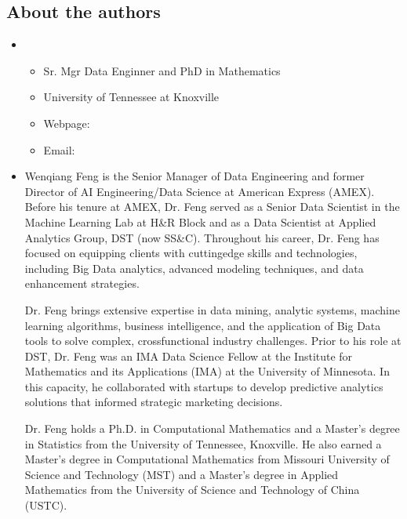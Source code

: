 \documentclass[letterpaper,11pt,english]{sphinxmanual}
\begin{document}
\subsection{About the authors}
\label{\detokenize{preface:about-the-authors}}\begin{itemize}
\item {} 
\sphinxAtStartPar
{}
\begin{itemize}
\item {} 
\sphinxAtStartPar
Sr. Mgr Data Enginner and PhD in Mathematics

\item {} 
\sphinxAtStartPar
University of Tennessee at Knoxville

\item {} 
\sphinxAtStartPar
Webpage: 

\item {} 
\sphinxAtStartPar
Email: 

\end{itemize}

\item {} 
\sphinxAtStartPar
{}

\sphinxAtStartPar
Wenqiang Feng is the Senior Manager of Data Engineering and former Director of
AI Engineering/Data Science at American Express (AMEX). Before his tenure at
AMEX, Dr. Feng served as a Senior Data Scientist in the Machine Learning Lab
at H\&R Block and as a Data Scientist at Applied Analytics Group, DST (now SS\&C).
Throughout his career, Dr. Feng has focused on equipping clients with cutting\sphinxhyphen{}edge
skills and technologies, including Big Data analytics, advanced modeling
techniques, and data enhancement strategies.

\sphinxAtStartPar
Dr. Feng brings extensive expertise in data mining, analytic systems, machine
learning algorithms, business intelligence, and the application of Big Data
tools to solve complex, cross\sphinxhyphen{}functional industry challenges. Prior to his
role at DST, Dr. Feng was an IMA Data Science Fellow at the Institute for
Mathematics and its Applications (IMA) at the University of Minnesota.
In this capacity, he collaborated with startups to develop predictive
analytics solutions that informed strategic marketing decisions.

\sphinxAtStartPar
Dr. Feng holds a Ph.D. in Computational Mathematics and a Master’s degree
in Statistics from the University of Tennessee, Knoxville. He also earned a
Master’s degree in Computational Mathematics from Missouri University
of Science and Technology (MST) and a Master’s degree in Applied
Mathematics from the University of Science and Technology of China (USTC).


\end{itemize}
\end{document}
